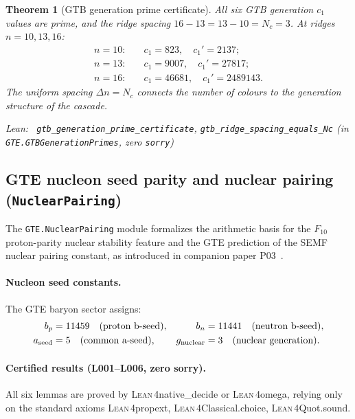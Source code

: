 \documentclass[11pt,a4paper]{article}
\newenvironment{leanref}%
  {\par\smallskip\noindent\begingroup\raggedright\textup{Lean:}~}%
  {\par\endgroup}
\newtheorem{theorem}{Theorem}[section]
\theoremstyle{definition}
\newcommand{\lean}{\textsc{Lean}\,4}
\begin{document}
\begin{theorem}[GTB generation prime certificate]\label{thm:gtb-gen-primes}
All six GTB generation $c_1$ values are prime, and the ridge spacing
$16 - 13 = 13 - 10 = N_c = 3$.  At ridges $n = 10, 13, 16$:
\begin{align*}
  n=10\colon & \quad c_1 = 823,\quad c_1' = 2137; \\
  n=13\colon & \quad c_1 = 9007,\quad c_1' = 27817; \\
  n=16\colon & \quad c_1 = 46681,\quad c_1' = 2489143.
\end{align*}
The uniform spacing $\Delta n = N_c$ connects the number of colours to the
generation structure of the cascade.
\begin{leanref}
\lstinline|gtb_generation_prime_certificate|,
\lstinline|gtb_ridge_spacing_equals_Nc|
\textup{(in \texttt{GTE.GTBGenerationPrimes}, zero \texttt{sorry})}
\end{leanref}
\end{theorem}

\subsection{GTE nucleon seed parity and nuclear pairing (\texttt{NuclearPairing})}\label{subsec:nuclear-pairing}

The \texttt{GTE.NuclearPairing} module formalizes the arithmetic basis for the
$F_{10}$ proton-parity nuclear stability feature and the GTE prediction of the
SEMF nuclear pairing constant, as introduced in companion paper P03~\cite{spivack2025nuclear_physics}.

\paragraph{Nucleon seed constants.}
The GTE baryon sector assigns:
\begin{align*}
b_p &= 11459 \quad\text{(proton b-seed)}, &
b_n &= 11441 \quad\text{(neutron b-seed)}, \\
a_{\rm seed} &= 5 \quad\text{(common a-seed)}, &
g_{\rm nuclear} &= 3 \quad\text{(nuclear generation)}.
\end{align*}

\paragraph{Certified results (L001--L006, zero sorry).}
All six lemmas are proved by \lean{native\_decide} or \lean{omega}, relying
only on the standard axioms \lean{propext}, \lean{Classical.choice}, \lean{Quot.sound}.
\end{document}
